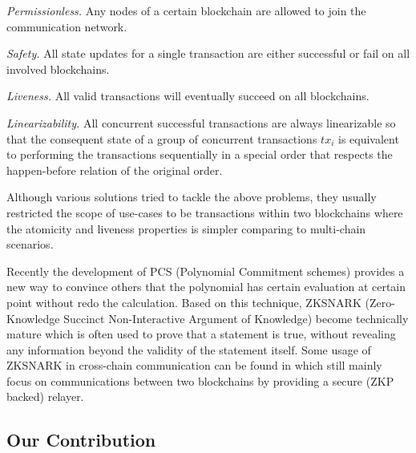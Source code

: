 \smallskip\noindent\emph{Permissionless.} Any nodes of a certain blockchain are allowed to join the communication network.

\smallskip\noindent\emph{Safety.} All state updates for a single transaction are either successful or fail on all involved blockchains.

\smallskip\noindent\emph{Liveness.} All valid transactions will eventually succeed on all blockchains.

\smallskip\noindent\emph{Linearizability.} All concurrent successful transactions are always linearizable so that the consequent state of a group of concurrent transactions $tx_i$ is equivalent to performing the transactions sequentially in a special order that respects the happen-before relation of the original order.

Although various solutions tried to tackle the above problems, they usually restricted the scope of use-cases to be transactions within two blockchains where the atomicity and liveness properties is simpler comparing to multi-chain scenarios.

Recently the development of PCS (Polynomial Commitment schemes) provides a new way to convince others that the polynomial has certain evaluation at certain point without redo the calculation. Based on this technique, ZKSNARK (Zero-Knowledge Succinct Non-Interactive Argument of Knowledge) become technically mature which is often used to prove that a statement is true, without revealing any information beyond the validity of the statement itself. Some usage of ZKSNARK in cross-chain communication can be found in \cite{sidechainzkp, cao2020-zk-atomic, garoffolo2020zendoo} which still mainly focus on communications between two blockchains by providing a secure (ZKP backed) relayer.

\subsection{Our Contribution}

